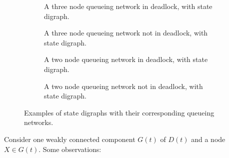 \documentclass{article}
\numberwithin{equation}{section}
\begin{document}
\begin{figure}[!htbp]
\begin{center}
  \begin{subfigure}{0.45\textwidth}
    \begin{center}
      
    \end{center}
    \caption{A three node queueing network in deadlock, with state digraph.}
    \label{fig:exampledigraph_deadlock}
  \end{subfigure}
  \hspace{6 mm}
  \begin{subfigure}{0.45\textwidth}
    \begin{center}
      
    \end{center}
    \caption{A three node queueing network not in deadlock, with state digraph.}
    \label{fig:exampledigraph_nodeadlock}
    \vspace{6 mm}
  \end{subfigure}
  \begin{subfigure}{0.45\textwidth}
    \begin{center}
      
    \end{center}
    \caption{A two node queueing network in deadlock, with state digraph.}
    \label{fig:exampledigraph_nodeadlock}
  \end{subfigure}
  \hspace{6 mm}
  \begin{subfigure}{0.45\textwidth}
    \begin{center}
      
    \end{center}
    \caption{A two node queueing network not in deadlock, with state digraph.}
    \label{fig:exampledigraph_nodeadlock}
    \vspace{6 mm}
  \end{subfigure}
  \end{center}
  \caption{Examples of state digraphs with their corresponding queueing networks.}
  \label{fig:exampledigraphs}
\end{figure}

Consider one weakly connected component $G(t)$ of $D(t)$ and a node $X \in G(t)$. Some observations:
\end{document}
